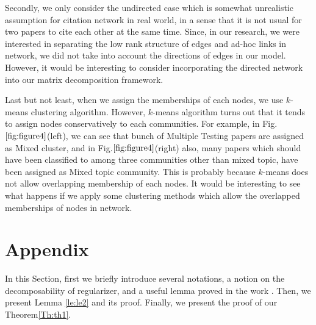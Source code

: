 \documentclass[AMS,STIX1COL]{WileyNJD-v2}
\begin{document}
{Secondly, we only consider the undirected case which is somewhat unrealistic assumption for citation network in real world, in a sense that it is not usual for two papers to cite each other at the same time.
Since, in our research, we were interested in separating the low rank structure of edges and ad-hoc links in network, we did not take into account the directions of edges in our model.
However, it would be interesting to consider incorporating the directed network into our matrix decomposition framework.

Last but not least, when we assign the memberships of each nodes, we use $k$-means clustering algorithm.
However, $k$-means algorithm turns out that it tends to assign nodes conservatively to each communities.
For example, in Fig.$\ref{fig:figure4}$(left), we can see that bunch of Multiple Testing papers are assigned as Mixed cluster, and in Fig.$\ref{fig:figure4}$(right) also, many papers which should have been classified to among three communities other than mixed topic, have been assigned as Mixed topic community.
This is probably because $k$-means does not allow overlapping membership of each nodes.
It would be interesting to see what happens if we apply some clustering methods which allow the overlapped memberships of nodes in network.

\section{Appendix}
In this Section, first we briefly introduce several notations, a notion on the decomposability of regularizer, and a useful lemma proved in the work \cite{agarwal2012noisy}.
Then, we present Lemma \ref{le:le2} and its proof.
Finally, we present the proof of our Theorem\ref{Th:th1}.

}
\end{document}
